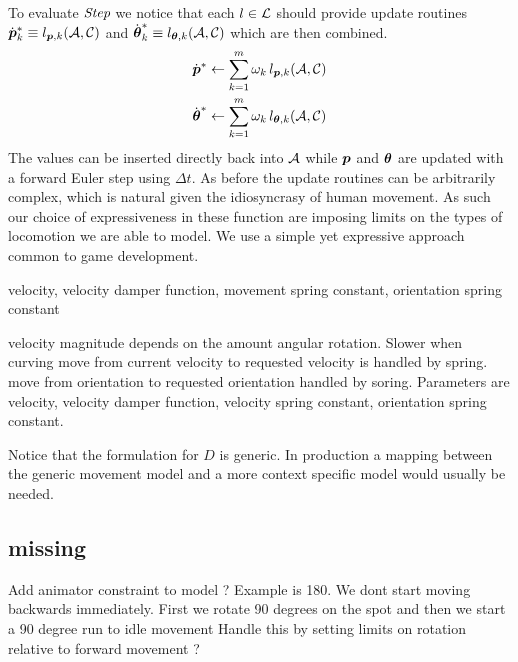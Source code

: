To evaluate $\textit{Step}$ we notice that each $l\in\mathcal{L}$ should provide update routines $\dot{\boldsymbol{p }}_k^* \equiv l_{\boldsymbol{p },k}(\mathcal{A},\mathcal{C})$ and $\dot{\boldsymbol{\theta }}_k^* \equiv l_{\boldsymbol{\theta }, k}(\mathcal{A},\mathcal{C})$ which are then combined.
\begin{subequations}
\begin{align}
\dot{\boldsymbol{p }}^*&\leftarrow \sum_{k=1}^{m}\omega_k \,l_{\boldsymbol{p },k}(\mathcal{A},\mathcal{C})\\
\dot{\boldsymbol{\theta }}^*&\leftarrow \sum_{k=1}^{m}\omega_k \,l_{\boldsymbol{\theta },k}(\mathcal{A},\mathcal{C})
\end{align}
\end{subequations}
The values can be inserted directly back into $\mathcal{A}$ while $\boldsymbol{p }$ and $\boldsymbol{\theta }$ are updated with a forward Euler step  using $\Delta{t}$. As before the update routines can be arbitrarily complex, which is natural given the idiosyncrasy of human movement. As such our choice of expressiveness in these function are imposing limits on the types of locomotion we are able to model. We use a simple yet expressive approach common to game development.   

velocity, velocity damper function, movement spring constant, orientation spring constant

velocity magnitude depends on the amount angular rotation. Slower when curving
move from current velocity to requested velocity is handled by spring.
move from orientation to requested orientation handled by soring.
Parameters are velocity, velocity damper function, velocity spring constant, orientation spring constant.


Notice that the formulation for $D$ is generic. In production a mapping between the generic movement model and a more context specific model would usually be needed. 

\subsection{missing}
Add animator constraint to model ? Example is 180. We dont start moving backwards immediately. First we rotate 90 degrees on the spot and then we start a 90 degree run to idle movement
Handle this by setting limits on rotation relative to forward movement ?

